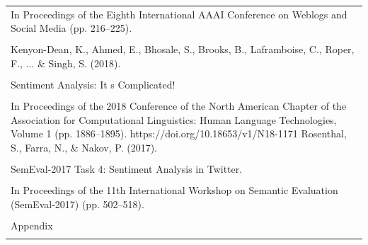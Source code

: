 \documentclass[11pt,a4paper,landscape]{article}
\begin{document}
\begin{longtable}{|p{\dimexpr\linewidth-2\tabcolsep-2\arrayrulewidth\relax}|}
\hline
\rule{0pt}{3.5cm} \\
\hline
In Proceedings of the Eighth International AAAI Conference on Weblogs and Social Media (pp. 216--225). \\[2pt]
\hline
\rule{0pt}{3.5cm} \\
\hline
Kenyon-Dean, K., Ahmed, E., Bhosale, S., Brooks, B., Laframboise, C., Roper, F., ... \& Singh, S. (2018). \\[2pt]
\hline
\rule{0pt}{3.5cm} \\
\hline
Sentiment Analysis: It s Complicated! \\[2pt]
\hline
\rule{0pt}{3.5cm} \\
\hline
In Proceedings of the 2018 Conference of the North American Chapter of the Association for Computational Linguistics: Human Language Technologies, Volume 1 (pp. 1886--1895). https://doi.org/10.18653/v1/N18-1171 Rosenthal, S., Farra, N., \& Nakov, P. (2017). \\[2pt]
\hline
\rule{0pt}{3.5cm} \\
\hline
SemEval-2017 Task 4: Sentiment Analysis in Twitter. \\[2pt]
\hline
\rule{0pt}{3.5cm} \\
\hline
In Proceedings of the 11th International Workshop on Semantic Evaluation (SemEval-2017) (pp. 502--518). \\[2pt]
\hline
\rule{0pt}{3.5cm} \\
\hline
Appendix \\[2pt]
\hline
\rule{0pt}{3.5cm} \\
\hline
\end{longtable}
\end{document}
